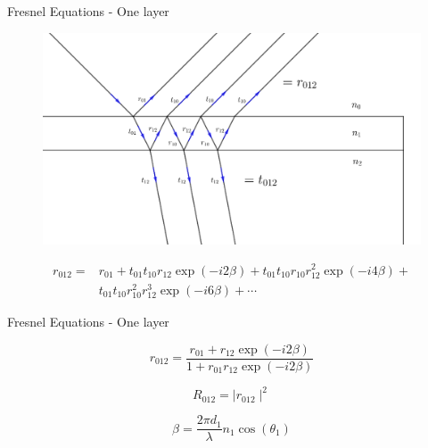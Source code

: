 \documentclass[10pt]{beamer}
\begin{document}
	\begin{frame}{Fresnel Equations - One layer}
	
	\begin{figure} 
		 \begin{center}
		   \includegraphics[width=\textwidth]{figreflre.png}
		 \end{center}
	\end{figure}
	\begin{align*}
	r_{012} = &r_{01} + t_{01}t_{10}r_{12}\exp(-i2\beta) + t_{01}t_{10}r_{10}r_{12}^2\exp(-i4\beta)+ \\ &t_{01}t_{10}r_{10}^2r_{12}^3\exp(-i6\beta)+ \cdots
	\end{align*} 
	
	\end{frame}
	
	\begin{frame}{Fresnel Equations - One layer}
	
	\begin{minipage}{0.47\textwidth}
	
		
	\begin{equation*}\label{eq:2layerreflect}
	r_{012}= \frac{r_{01}+r_{12}\exp(-i2\beta)}{1+r_{01}r_{12}\exp(-i2\beta)}
	\end{equation*}
	
	\begin{equation*}
	R_{012} = \mid r_{012} \mid ^2 
	\end{equation*}
	 
	\end{minipage}
	\begin{minipage}{0.5\textwidth}
	\begin{equation*}
	\beta=\frac{2\pi d_1}{\lambda} n_1\cos(\theta_1)
	\end{equation*}
	\end{minipage}	
	\end{frame}
	
\end{document}
